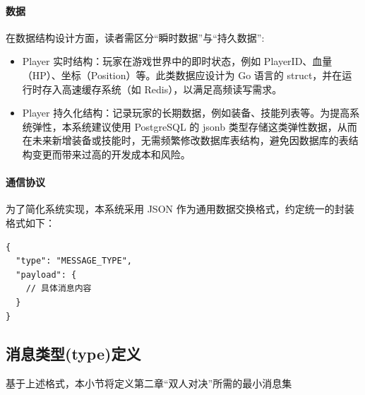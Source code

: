 \paragraph{数据} 在数据结构设计方面，读者需区分“瞬时数据”与“持久数据”:
\begin{itemize}
    \item Player 实时结构：玩家在游戏世界中的即时状态，例如 PlayerID、血量（HP）、坐标（Position）等。此类数据应设计为 Go 语言的 struct，并在运行时存入高速缓存系统（如 Redis），以满足高频读写需求。
    \item Player 持久化结构：记录玩家的长期数据，例如装备、技能列表等。为提高系统弹性，本系统建议使用 PostgreSQL 的 jsonb 类型存储这类弹性数据，从而在未来新增装备或技能时，无需频繁修改数据库表结构，避免因数据库的表结构变更而带来过高的开发成本和风险。
\end{itemize}
\paragraph{通信协议} 
为了简化系统实现，本系统采用 JSON 作为通用数据交换格式，约定统一的封装格式如下：

\begin{tcolorbox}[title=统一消息格式]
\begin{verbatim}
{
  "type": "MESSAGE_TYPE",
  "payload": {
    // 具体消息内容
  }
}
\end{verbatim}
\end{tcolorbox}

\subsection{消息类型(type)定义}

基于上述格式，本小节将定义第二章“双人对决”所需的最小消息集


